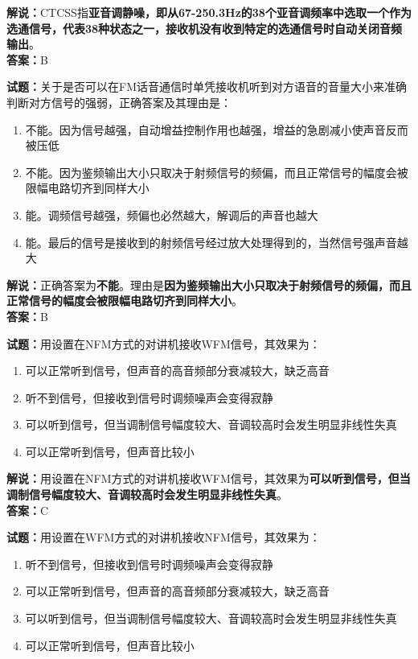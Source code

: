 \documentclass{ctexbook}
\begin{document}
\noindent\textbf{解说：}CTCSS指\textbf{亚音调静噪，即从67-250.3Hz的38个亚音调频率中选取一个作为选通信号，代表38种状态之一，接收机没有收到特定的选通信号时自动关闭音频输出}。\\\noindent\textbf{答案：}B


\bigskip


\noindent\textbf{试题：}关于是否可以在FM话音通信时单凭接收机听到对方语音的音量大小来准确判断对方信号的强弱，正确答案及其理由是：

\begin{enumerate}[leftmargin=3em]
	\item 不能。因为信号越强，自动增益控制作用也越强，增益的急剧减小使声音反而被压低
	\item 不能。因为鉴频输出大小只取决于射频信号的频偏，而且正常信号的幅度会被限幅电路切齐到同样大小
	\item 能。调频信号越强，频偏也必然越大，解调后的声音也越大
	\item 能。最后的信号是接收到的射频信号经过放大处理得到的，当然信号强声音越大
\end{enumerate}

\noindent\textbf{解说：}正确答案为\textbf{不能}。理由是\textbf{因为鉴频输出大小只取决于射频信号的频偏，而且正常信号的幅度会被限幅电路切齐到同样大小}。\\\noindent\textbf{答案：}B


\bigskip


\noindent\textbf{试题：}用设置在NFM方式的对讲机接收WFM信号，其效果为：

\begin{enumerate}[leftmargin=3em]
	\item 可以正常听到信号，但声音的高音频部分衰减较大，缺乏高音
	\item 听不到信号，但接收到信号时调频噪声会变得寂静
	\item 可以听到信号，但当调制信号幅度较大、音调较高时会发生明显非线性失真
	\item 可以正常听到信号，但声音比较小
\end{enumerate}

\noindent\textbf{解说：}用设置在NFM方式的对讲机接收WFM信号，其效果为\textbf{可以听到信号，但当调制信号幅度较大、音调较高时会发生明显非线性失真}。\\\noindent\textbf{答案：}C


\bigskip


\noindent\textbf{试题：}用设置在WFM方式的对讲机接收NFM信号，其效果为：

\begin{enumerate}[leftmargin=3em]
	\item 听不到信号，但接收到信号时调频噪声会变得寂静
	\item 可以正常听到信号，但声音的高音频部分衰减较大，缺乏高音
	\item 可以听到信号，但当调制信号幅度较大、音调较高时会发生明显非线性失真
	\item 可以正常听到信号，但声音比较小
\end{enumerate}
\end{document}
